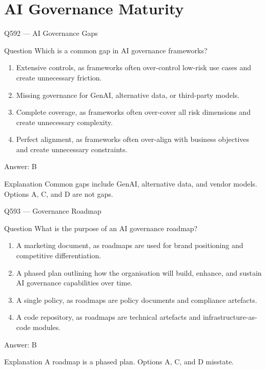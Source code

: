 \documentclass[aspectratio=169,8pt]{beamer}
\begin{document}
	

	
	\section{AI Governance Maturity}

	
	\begin{frame}{Q592 --- AI Governance Gaps}
		\begin{block}{Question}
			Which is a common gap in AI governance frameworks?
			\begin{enumerate}
				\item Extensive controls, as frameworks often over-control low-risk use cases and create unnecessary friction.
				\item Missing governance for GenAI, alternative data, or third-party models.
				\item Complete coverage, as frameworks often over-cover all risk dimensions and create unnecessary complexity.
				\item Perfect alignment, as frameworks often over-align with business objectives and create unnecessary constraints.
			\end{enumerate}
		\end{block}
		\begin{exampleblock}{Answer: B}\end{exampleblock}
		\begin{block}{Explanation}
			Common gaps include GenAI, alternative data, and vendor models. Options A, C, and D are not gaps.
		\end{block}
	\end{frame}
	
	\begin{frame}{Q593 --- Governance Roadmap}
		\begin{block}{Question}
			What is the purpose of an AI governance roadmap?
			\begin{enumerate}
				\item A marketing document, as roadmaps are used for brand positioning and competitive differentiation.
				\item A phased plan outlining how the organisation will build, enhance, and sustain AI governance capabilities over time.
				\item A single policy, as roadmaps are policy documents and compliance artefacts.
				\item A code repository, as roadmaps are technical artefacts and infrastructure-as-code modules.
			\end{enumerate}
		\end{block}
		\begin{exampleblock}{Answer: B}\end{exampleblock}
		\begin{block}{Explanation}
			A roadmap is a phased plan. Options A, C, and D misstate.
		\end{block}
	\end{frame}
	
\end{document}
